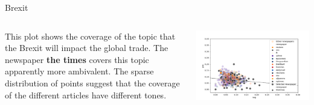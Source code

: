 \documentclass[final]{beamer}
\newlength{\twocolwid}
\begin{document}
\begin{frame}[t]
\begin{columns}[t]
\begin{column}{\twocolwid}

\begin{block}{Brexit}


    \begin{columns}[onlytextwidth]
        \begin{column}{.6\textwidth}
            This plot shows the coverage of the topic that the Brexit will impact the global trade. The newspaper \textbf{the times} covers this topic apparently more ambivalent. The sparse distribution of points suggest that the coverage of the different articles have different tones.
        \end{column}
        \begin{column}{.4\textwidth}
            \includegraphics[width=0.8\linewidth]{poster/brexit_5_thetimes.png} 
        \end{column}
    \end{columns}

\end{block}



\end{column}
\end{columns}
\end{frame}
\end{document}
